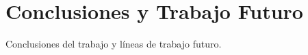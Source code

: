 \chapter{Conclusiones y Trabajo Futuro}
\label{cap:conclusiones}

Conclusiones del trabajo y líneas de trabajo futuro.


